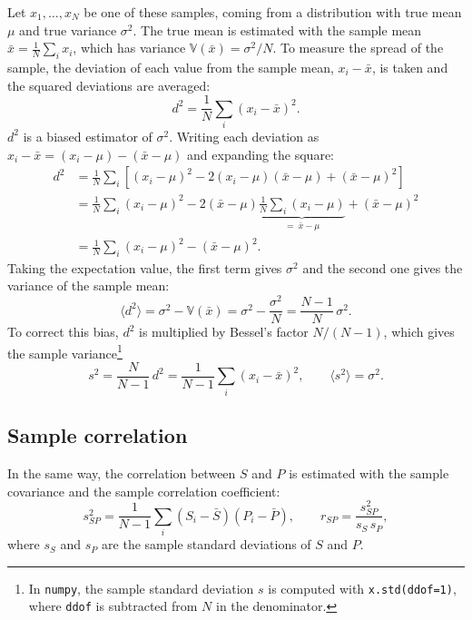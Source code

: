 \documentclass[11pt,a4paper]{article}
\begin{document}
	Let $x_1, \dots, x_N$ be one of these samples, coming from a distribution with true mean $\mu$ and true variance $\sigma^2$.
	The true mean is estimated with the sample mean $\bar{x} = \frac{1}{N} \sum_i x_i$, which has variance $\mathbb{V}(\bar{x}) = \sigma^2 / N$.
	To measure the spread of the sample, the deviation of each value from the sample mean, $x_i - \bar{x}$, is taken and the squared deviations are averaged:
	\begin{equation}
		d^2 = \frac{1}{N} \sum_i (x_i - \bar{x})^2 .
	\end{equation}
	$d^2$ is a biased estimator of $\sigma^2$.
	Writing each deviation as $x_i - \bar{x} = (x_i - \mu) - (\bar{x} - \mu)$ and expanding the square:
	\begin{equation}
		\begin{aligned}
			d^2 &= \frac{1}{N} \sum_i \left[ (x_i - \mu)^2 - 2 (x_i - \mu)(\bar{x} - \mu) + (\bar{x} - \mu)^2 \right] \\
			&= \frac{1}{N} \sum_i (x_i - \mu)^2 - 2 (\bar{x} - \mu) \underbrace{\frac{1}{N} \sum_i (x_i - \mu)}_{=\ \bar{x} - \mu} + (\bar{x} - \mu)^2 \\
			&= \frac{1}{N} \sum_i (x_i - \mu)^2 - (\bar{x} - \mu)^2 .
		\end{aligned}
	\end{equation}
	Taking the expectation value, the first term gives $\sigma^2$ and the second one gives the variance of the sample mean:
	\begin{equation}
		\langle d^2 \rangle = \sigma^2 - \mathbb{V}(\bar{x}) = \sigma^2 - \frac{\sigma^2}{N} = \frac{N-1}{N}\, \sigma^2 .
	\end{equation}
	To correct this bias, $d^2$ is multiplied by Bessel's factor $N / (N-1)$, which gives the sample variance\footnote{In \texttt{numpy}, the sample standard deviation $s$ is computed with \texttt{x.std(ddof=1)}, where \texttt{ddof} is subtracted from $N$ in the denominator.}
	\begin{equation}
		s^2 = \frac{N}{N-1}\, d^2 = \frac{1}{N-1} \sum_i (x_i - \bar{x})^2 , \qquad \langle s^2 \rangle = \sigma^2 .
	\end{equation}
	
	\subsection*{Sample correlation}
	
	In the same way, the correlation between $S$ and $P$ is estimated with the sample covariance and the sample correlation coefficient:
	\begin{equation}
		s^2_{SP} = \frac{1}{N-1} \sum_i (S_i - \bar{S})(P_i - \bar{P}), \qquad r_{SP} = \frac{s^2_{SP}}{s_S\, s_P} ,
	\end{equation}
	where $s_S$ and $s_P$ are the sample standard deviations of $S$ and $P$.
	
\end{document}
